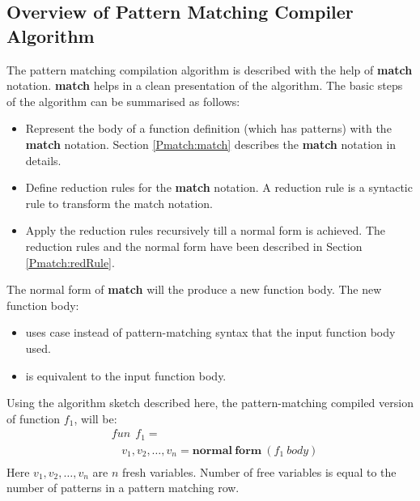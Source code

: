 \documentclass[11pt]{article}
\begin{document}
\subsection {Overview of Pattern Matching Compiler Algorithm}
The pattern matching compilation algorithm is described with the help of {\bf match} notation. {\bf match} helps in a clean presentation of the algorithm. The basic steps of the algorithm can be summarised as follows:
\begin{itemize}
  \item Represent the body of a function definition (which has patterns) with the {\bf match} notation. Section \ref{Pmatch:match} describes the {\bf match} notation in details.
  \item Define reduction rules for the {\bf match} notation. A reduction rule is a syntactic rule to transform the match notation.
  \item Apply the reduction rules recursively till a normal form is achieved. The reduction rules and the normal form have been described in Section \ref {Pmatch:redRule}.
\end{itemize}
The normal form of {\bf match} will the produce a new function body. The new function body:
\begin{itemize}
  \item uses {\sf case} instead of pattern-matching syntax that the input function body used.
  \item is equivalent to the input function body.
\end{itemize}
Using the algorithm sketch described here, the pattern-matching compiled version of function $f_1$, will be:
\begin{align*} 
&fun~~f_1 = \\
&~~~~ v_1,v_2,\ldots,v_n = \mathbf{normal~form}~(f_1~body) \\
\end{align*}
Here $v_1,v_2,\ldots,v_n$ are $n$ fresh variables. Number of free variables is equal to the number of patterns in a pattern matching row.
\end{document}
